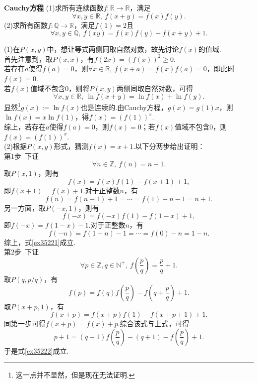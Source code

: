 \documentclass[lang=cn, zihao=5]{elegantbook}
\newcommand{\ssb}[1]{\left( #1 \right)}
\newcommand{\R}{\mathbb{R}}
\newcommand{\examplefont}[1]{\color{mgreen} \textbf{#1}}
\begin{document}
\begin{example}{\examplefont{Cauchy方程}}
	(1)求所有连续函数$f:\R \to \R$，满足$$\forall x,y\in \R,~f(x+y)=f(x)f(y).$$
	(2)求所有函数$f:\mathbb{Q} \to \R$，满足$f(1)=2$且$$\forall x,y \in \mathbb{Q},~f(xy)=f(x)f(y)-f(x+y)+1.$$
\end{example}
\begin{solution}
	(1)在$P(x,y)$中，想让等式两侧同取自然对数，故先讨论$f(x)$的值域. \\
	首先注意到，取$P(x,x)$，有$f(2x)=(f(x))^2 \geq 0$. \\
	若存在$a$使得$f(a)=0$，则$\forall x \in \R,~f(x+a)=f(x)f(a)=0$，即此时$f(x)=0$. \\
	若$f(x)$值域不包含$0$，则将$P(x,y)$两侧同取自然对数，可得$$\forall x,y \in \R,~ \ln f(x+y) = \ln f(x) + \ln f(y).$$
	显然\footnote{这一点并不显然，但是现在无法证明.}$g(x):= \ln f(x)$也是连续的.由Cauchy方程，$g(x)=g(1)x$，则$\ln f(x) = x \ln f(1)$，得$f(x)=(f(1))^x$. \\
	综上，若存在$a$使得$f(a)=0$，则$f(x)=0$；若$f(x)$值域不包含$0$，则$f(x)=(f(1))^x$. \\
	(2)根据$P(x,y)$形式，猜测$f(x)=x+1$.以下分两步给出证明： \\
	第$1$步~下证
	\begin{equation}
		\forall n \in \mathbb{Z},~ f(n)=n+1. \label{ex35221}
	\end{equation}
	取$P(x,1)$，则有$$f(x)=f(x)f(1)-f(x+1)+1,$$
	即$f(x+1)=f(x)+1$.对于正整数$n$，有$$f(n)=f(n-1)+1=\cdots = f(1)+n-1=n+1.$$
	另一方面，取$P(-x,1)$，则有$$f(-x)=f(-x)f(1)-f(1-x)+1,$$
	即$f(-x)=f(1-x)-1$.对于正整数$n$，有$$f(-n)=f(1-n)-1=\cdots = f(0)-n=1-n.$$
	综上，式\ref{ex35221}成立. \\
	第$2$步~下证
	\begin{equation}
		\forall p \in \mathbb{Z},q \in \mathbb{N}^+,~f\ssb{\frac{p}{q}} = \frac{p}{q} +1. \label{ex35222}
	\end{equation}
	取$P(q,p/q)$，有$$f(p) =f(q)f\ssb{\frac{p}{q}} - f\ssb{q+\frac{p}{q}}+1.$$
	取$P(x+p,1)$，有$$f(x+p)=f(x+p)f(1)-f(x+p+1)+1.$$
	同第一步可得$f(x+p)=f(x)+p$.综合该式与上式，可得$$p+1 = (q+1)f\ssb{\frac{p}{q}} - (q+1) - f\ssb{\frac{p}{q}} +1.$$
	于是式\ref{ex35222}成立.
\end{solution}
\end{document}
